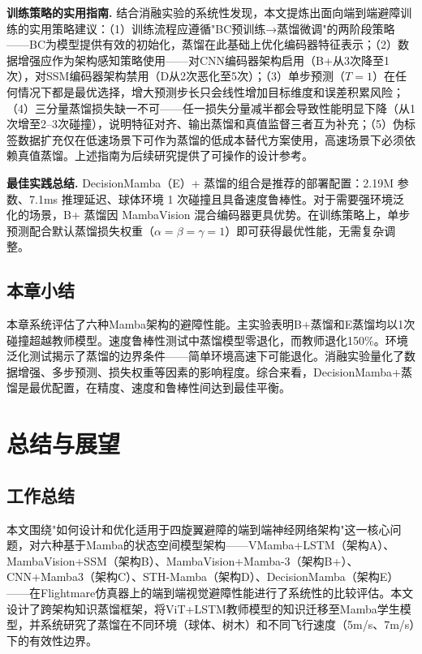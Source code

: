 \documentclass[12pt,a4paper]{article}
\makeatletter
\numberwithin{equation}{section}
\numberwithin{figure}{section}
\numberwithin{table}{section}
\newcommand{\cleardoublepage}{\clearpage\if@twoside\ifodd\c@page\else\hbox{}\thispagestyle{empty}\newpage\if@twocolumn\hbox{}\newpage\fi\fi\fi}%
\makeatother
\begin{document}
\textbf{训练策略的实用指南.} 结合消融实验的系统性发现，本文提炼出面向端到端避障训练的实用策略建议：（1）训练流程应遵循"BC预训练→蒸馏微调"的两阶段策略——BC为模型提供有效的初始化，蒸馏在此基础上优化编码器特征表示；（2）数据增强应作为架构感知策略使用——对CNN编码器架构启用（B+从3次降至1次），对SSM编码器架构禁用（D从2次恶化至5次）；（3）单步预测（$T=1$）在任何情况下都是最优选择，增大预测步长只会线性增加目标维度和误差积累风险；（4）三分量蒸馏损失缺一不可——任一损失分量减半都会导致性能明显下降（从1次增至2--3次碰撞），说明特征对齐、输出蒸馏和真值监督三者互为补充；（5）伪标签数据扩充仅在低速场景下可作为蒸馏的低成本替代方案使用，高速场景下必须依赖真值蒸馏。上述指南为后续研究提供了可操作的设计参考。

\textbf{最佳实践总结.} DecisionMamba（E）+ 蒸馏的组合是推荐的部署配置：2.19M 参数、7.1ms 推理延迟、球体环境 1 次碰撞且具备速度鲁棒性。对于需要强环境泛化的场景，B+ 蒸馏因 MambaVision 混合编码器更具优势。在训练策略上，单步预测配合默认蒸馏损失权重（$\alpha=\beta=\gamma=1$）即可获得最优性能，无需复杂调整。

\subsection{本章小结}

本章系统评估了六种Mamba架构的避障性能。主实验表明B+蒸馏和E蒸馏均以1次碰撞超越教师模型。速度鲁棒性测试中蒸馏模型零退化，而教师退化150\%。环境泛化测试揭示了蒸馏的边界条件——简单环境高速下可能退化。消融实验量化了数据增强、多步预测、损失权重等因素的影响程度。综合来看，DecisionMamba+蒸馏是最优配置，在精度、速度和鲁棒性间达到最佳平衡。

\cleardoublepage
\section{总结与展望}

\subsection{工作总结}

本文围绕"如何设计和优化适用于四旋翼避障的端到端神经网络架构"这一核心问题，对六种基于Mamba的状态空间模型架构——VMamba+LSTM（架构A）、MambaVision+SSM（架构B）、MambaVision+Mamba-3（架构B+）、CNN+Mamba3（架构C）、STH-Mamba（架构D）、DecisionMamba（架构E）——在Flightmare仿真器\cite{shah2017flightmare}上的端到端视觉避障性能进行了系统性的比较评估。本文设计了跨架构知识蒸馏框架，将ViT+LSTM教师模型\cite{bhattacharya2024vitfly}的知识迁移至Mamba学生模型，并系统研究了蒸馏在不同环境（球体、树木）和不同飞行速度（5m/s、7m/s）下的有效性边界。
\end{document}

